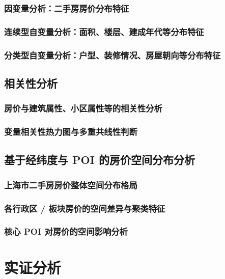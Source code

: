 \documentclass[UTF8]{ctexart}
\begin{document}
\subsubsection{因变量分析：二手房房价分布特征} 

\subsubsection{连续型自变量分析：面积、楼层、建成年代等分布特征}

\subsubsection{分类型自变量分析：户型、装修情况、房屋朝向等分布特征}

\subsection{相关性分析} 

\subsubsection{房价与建筑属性、小区属性等的相关性分析} 

\subsubsection{变量相关性热力图与多重共线性判断}

\subsection{基于经纬度与 POI 的房价空间分布分析}

\subsubsection{上海市二手房房价整体空间分布格局}

\subsubsection{各行政区 / 板块房价的空间差异与聚类特征}

\subsubsection{核心 POI 对房价的空间影响分析}

\section{实证分析}
\end{document}
